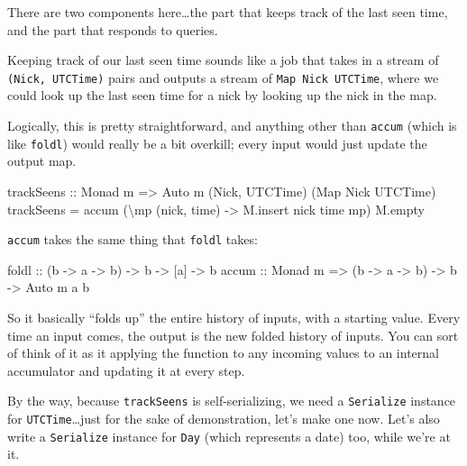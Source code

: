 \documentclass[]{article}
\newenvironment{Shaded}{}{}
\newcommand{\DataTypeTok}[1]{\textcolor[rgb]{0.56,0.13,0.00}{#1}}
\newcommand{\FunctionTok}[1]{\textcolor[rgb]{0.02,0.16,0.49}{#1}}
\newcommand{\NormalTok}[1]{#1}
\newcommand{\OtherTok}[1]{\textcolor[rgb]{0.00,0.44,0.13}{#1}}
\begin{document}
There are two components here\ldots the part that keeps track of the last seen
time, and the part that responds to queries.

Keeping track of our last seen time sounds like a job that takes in a stream of
\texttt{(Nick,\ UTCTime)} pairs and outputs a stream of
\texttt{Map\ Nick\ UTCTime}, where we could look up the last seen time for a
nick by looking up the nick in the map.

Logically, this is pretty straightforward, and anything other than
\texttt{accum} (which is like \texttt{foldl\textquotesingle{}}) would really be
a bit overkill; every input would just update the output map.

\begin{Shaded}
\begin{Highlighting}[]
\OtherTok{trackSeens ::} \DataTypeTok{Monad}\NormalTok{ m }\OtherTok{=>} \DataTypeTok{Auto}\NormalTok{ m (}\DataTypeTok{Nick}\NormalTok{, }\DataTypeTok{UTCTime}\NormalTok{) (}\DataTypeTok{Map} \DataTypeTok{Nick} \DataTypeTok{UTCTime}\NormalTok{)}
\NormalTok{trackSeens }\OtherTok{=}\NormalTok{ accum (\textbackslash{}mp (nick, time) }\OtherTok{{-}>}\NormalTok{ M.insert nick time mp) M.empty}
\end{Highlighting}
\end{Shaded}

\texttt{accum} takes the same thing that \texttt{foldl} takes:

\begin{Shaded}
\begin{Highlighting}[]
\FunctionTok{foldl}\OtherTok{ ::}\NormalTok{            (b }\OtherTok{{-}>}\NormalTok{ a }\OtherTok{{-}>}\NormalTok{ b) }\OtherTok{{-}>}\NormalTok{ b }\OtherTok{{-}>}\NormalTok{ [a] }\OtherTok{{-}>}\NormalTok{ b}
\OtherTok{accum ::} \DataTypeTok{Monad}\NormalTok{ m }\OtherTok{=>}\NormalTok{ (b }\OtherTok{{-}>}\NormalTok{ a }\OtherTok{{-}>}\NormalTok{ b) }\OtherTok{{-}>}\NormalTok{ b }\OtherTok{{-}>} \DataTypeTok{Auto}\NormalTok{ m a b}
\end{Highlighting}
\end{Shaded}

So it basically ``folds up'' the entire history of inputs, with a starting
value. Every time an input comes, the output is the new folded history of
inputs. You can sort of think of it as it applying the function to any incoming
values to an internal accumulator and updating it at every step.

By the way, because \texttt{trackSeens} is self-serializing, we need a
\texttt{Serialize} instance for \texttt{UTCTime}\ldots just for the sake of
demonstration, let's make one now. Let's also write a \texttt{Serialize}
instance for \texttt{Day} (which represents a date) too, while we're at it.
\end{document}
